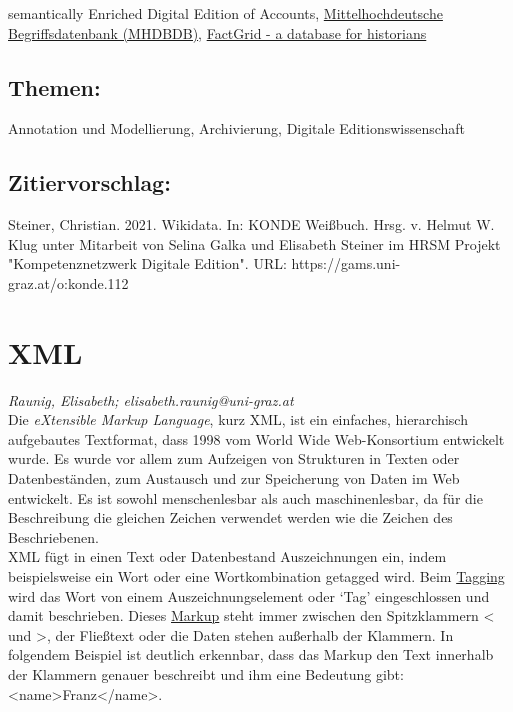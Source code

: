 \documentclass{article}
\begin{document}
{                           semantically Enriched Digital Edition of Accounts}, \href{http://mhdbdb.sbg.ac.at/}{Mittelhochdeutsche
                           Begriffsdatenbank (MHDBDB)}, \href{https://blog.factgrid.de/}{FactGrid - a
                           database for historians}\subsection*{Themen:}Annotation und Modellierung, Archivierung, Digitale Editionswissenschaft\subsection*{Zitiervorschlag:}Steiner, Christian. 2021. Wikidata. In: KONDE Weißbuch. Hrsg. v. Helmut W. Klug unter Mitarbeit von Selina Galka und Elisabeth Steiner im HRSM Projekt "Kompetenznetzwerk Digitale Edition". URL: https://gams.uni-graz.at/o:konde.112\newpage\section*{XML} \emph{Raunig, Elisabeth; elisabeth.raunig@uni-graz.at }\\
        
    Die \emph{eXtensible Markup Language}, kurz XML, ist ein
                  einfaches, hierarchisch aufgebautes Textformat, dass 1998 vom World Wide
                  Web-Konsortium entwickelt wurde. Es wurde vor allem zum Aufzeigen von Strukturen
                  in Texten oder Datenbeständen, zum Austausch und zur Speicherung von Daten im Web
                  entwickelt. Es ist sowohl menschenlesbar als auch maschinenlesbar, da für die
                  Beschreibung die gleichen Zeichen verwendet werden wie die Zeichen des
                  Beschriebenen.\\
            
        XML fügt in einen Text oder Datenbestand Auszeichnungen ein, indem beispielsweise
                  ein Wort oder eine Wortkombination getagged wird. Beim \href{http://gams.uni-graz.at/o:konde.17}{Tagging} wird das Wort von einem Auszeichnungselement
                  oder ‘Tag’ eingeschlossen und damit beschrieben. Dieses \href{http://gams.uni-graz.at/o:konde.126}{Markup} steht immer zwischen den Spitzklammern <
                  und >, der Fließtext oder die Daten stehen außerhalb der Klammern. In folgendem
                  Beispiel ist deutlich erkennbar, dass das Markup den Text innerhalb der Klammern
                  genauer beschreibt und ihm eine Bedeutung gibt:
                     <name>Franz</name>. \\
            
\end{document}
